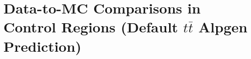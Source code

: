 \section{Data-to-MC Comparisons in Control Regions (Default $t\bar{t}$ {\sc Alpgen} Prediction)}
\label{app:DataMCControl}


\clearpage

\clearpage

